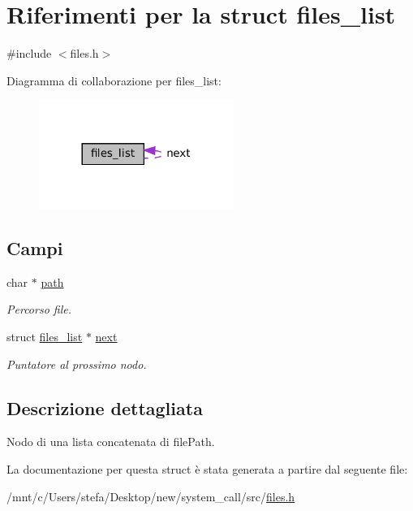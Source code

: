 \hypertarget{structfiles__list}{}\section{Riferimenti per la struct files\+\_\+list}
\label{structfiles__list}


{\ttfamily \#include $<$files.\+h$>$}



Diagramma di collaborazione per files\+\_\+list\+:\nopagebreak
\begin{figure}[H]
\begin{center}
\leavevmode
\includegraphics[width=180pt]{structfiles__list__coll__graph}
\end{center}
\end{figure}
\subsection*{Campi}
\begin{DoxyCompactItemize}
\item 
\mbox{\label{structfiles__list_a986ecc1174faf39b15c1ef655c2ed966}} 
char $\ast$ \hyperlink{structfiles__list_a986ecc1174faf39b15c1ef655c2ed966}{path}
\begin{DoxyCompactList}\small\item\em Percorso file. \end{DoxyCompactList}\item 
\mbox{\label{structfiles__list_a3cdd0098b7fb9589480f8a9facad90ce}} 
struct \hyperlink{structfiles__list}{files\+\_\+list} $\ast$ \hyperlink{structfiles__list_a3cdd0098b7fb9589480f8a9facad90ce}{next}
\begin{DoxyCompactList}\small\item\em Puntatore al prossimo nodo. \end{DoxyCompactList}\end{DoxyCompactItemize}


\subsection{Descrizione dettagliata}
Nodo di una lista concatenata di file\+Path. 

La documentazione per questa struct è stata generata a partire dal seguente file\+:\begin{DoxyCompactItemize}
\item 
/mnt/c/\+Users/stefa/\+Desktop/new/system\+\_\+call/src/\hyperlink{files_8h}{files.\+h}\end{DoxyCompactItemize}
